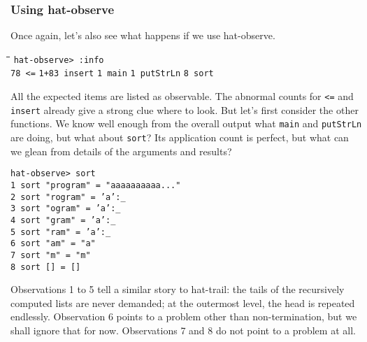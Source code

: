 \documentclass[12pt]{article}
\newcommand{\mkblue}[1]{#1}
\begin{document}
\subsubsection*{Using hat-observe}
Once again, let's also see what happens if we use hat-observe.
\begin{tabbing}
\hspace{2.5cm}\=\hspace{2.5cm}\=\hspace{2.5cm}\=\hspace{2.5cm}\=\kill
{\tt hat-observe> :info } \\
{\tt 78 <=}       \> {\tt 1+83 insert}    \>  {\tt 1 main} \>
{\tt 1 putStrLn} \> {\tt 8 sort} \\
\end{tabbing}
All the expected items are listed as observable. The abnormal counts for
{\tt <=} and {\tt insert} already give a strong clue where to look.
But let's first consider the other functions.
We know well
enough from the overall output what {\tt main} and {\tt putStrLn} are doing,
but what about {\tt sort}? Its application count is perfect, but what can
we glean from details of the arguments and results?
\begin{tabbing}
{\tt hat-observe> sort } \\
{\tt \mkblue{1} sort "program" = "aaaaaaaaaa..." } \\
{\tt \mkblue{2} sort "rogram" = 'a':\verb"_" } \\
{\tt \mkblue{3} sort "ogram" = 'a':\verb"_" } \\
{\tt \mkblue{4} sort "gram" = 'a':\verb"_" } \\
{\tt \mkblue{5} sort "ram" = 'a':\verb"_" } \\
{\tt \mkblue{6} sort "am" = "a" } \\
{\tt \mkblue{7} sort "m" = "m" } \\
{\tt \mkblue{8} sort [] = [] }
\end{tabbing}
Observations 1 to 5 tell a similar story to hat-trail: the tails
of the recursively computed lists are never demanded; at the
outermost level, the head is repeated endlessly.
Observation 6 points to a problem other than non-termination,
but we shall ignore that for now.  Observations
7 and 8 do not point to a problem at all.
\end{document}
